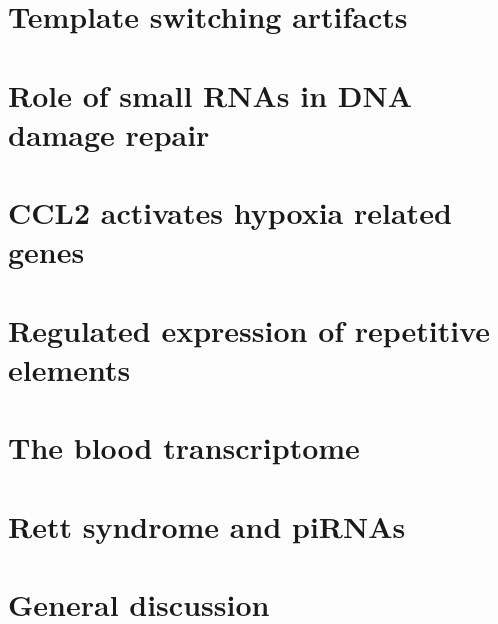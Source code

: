 \documentclass[12pt,a4paper]{report}
\begin{document}
\chapter{Template switching artifacts}



\chapter{Role of small RNAs in DNA damage repair}



\chapter{CCL2 activates hypoxia related genes}


\chapter{Regulated expression of repetitive elements}


\chapter{The blood transcriptome}


\chapter{Rett syndrome and piRNAs}



%

\chapter{General discussion}




\end{document}
